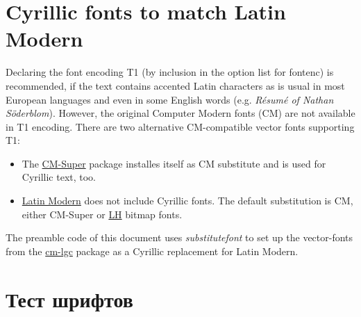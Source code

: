 \documentclass[a4paper]{scrartcl}
\begin{document}
\section*{Cyrillic fonts to match Latin Modern}

Declaring the font encoding T1 (by inclusion in the option list for fontenc)
is recommended, if the text contains accented Latin characters as is usual
in most European languages and even in some English words (e.g. \emph{Résumé
of Nathan Söderblom}). However, the original Computer Modern fonts (CM) are
not available in T1 encoding. There are two alternative CM-compatible vector
fonts supporting T1:

\begin{itemize}

\item The \href{http://www.ctan.org/pkg/cm-super}{CM-Super} package installes
      itself as CM substitute and is used for Cyrillic text, too. 

\item \href{http://www.ctan.org/pkg/lm}{Latin Modern} does not include Cyrillic
      fonts. The default substitution is CM, either CM-Super or
      \href{http://www.ctan.org/pkg/LH}{LH} bitmap fonts.
\end{itemize}

The preamble code of this document uses \emph{substitutefont} to set up the
vector-fonts from the \href{http://www.ctan.org/pkg/cm-lgc}{cm-lgc}
package as a Cyrillic replacement for Latin Modern.

\section{\foreignlanguage{russian}{Тест шрифтов}}

\newcommand{\teststring}{Hello world! 
	    \foreignlanguage{russian}{Здравствуй, мир!}}
\end{document}
